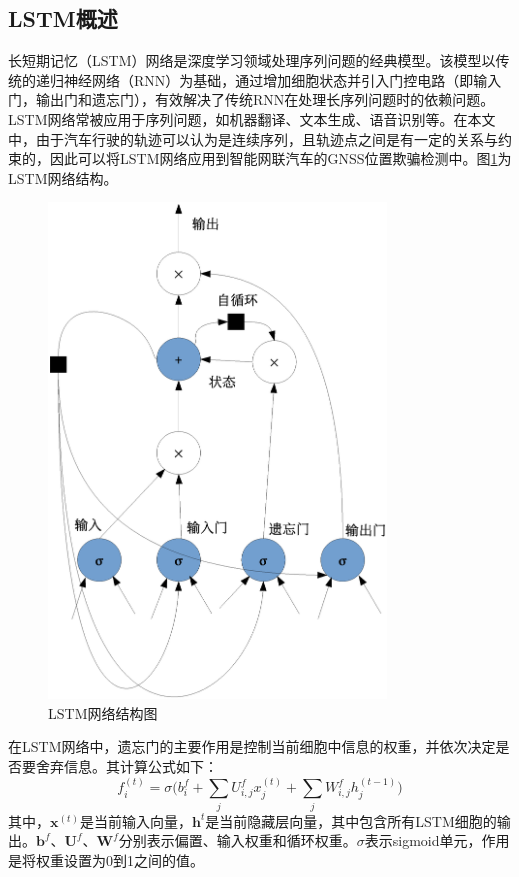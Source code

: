 \subsection{LSTM概述}
长短期记忆（LSTM）网络是深度学习领域处理序列问题的经典模型。该模型以传统的递归神经网络（RNN）为基础，通过增加细胞状态并引入门控电路（即输入门，输出门和遗忘门），有效解决了传统RNN在处理长序列问题时的依赖问题。LSTM网络常被应用于序列问题，如机器翻译、文本生成、语音识别等。在本文中，由于汽车行驶的轨迹可以认为是连续序列，且轨迹点之间是有一定的关系与约束的，因此可以将LSTM网络应用到智能网联汽车的GNSS位置欺骗检测中。图\ref{fig:LSTM_arch}为LSTM网络结构。

\begin{figure}[htbp]
    \begin{center}
        \includegraphics[width=0.8\textwidth]{../graphics/LSTM.eps}
        \caption{LSTM网络结构图}
        \label{fig:LSTM_arch}
    \end{center}
\end{figure}

在LSTM网络中，遗忘门的主要作用是控制当前细胞中信息的权重，并依次决定是否要舍弃信息。其计算公式如下：
\begin{equation}
    f_i^{(t)}=\sigma\bigg(b_i^f+\sum_jU_{i,j}^fx_j^(t)+\sum_jW_{i,j}^fh_j^{(t-1)}\bigg)
    \label{eq:3}
\end{equation}
其中，$\textbf{x}^{(t)}$是当前输入向量，$\textbf{h}^t$是当前隐藏层向量，其中包含所有LSTM细胞的输出。$\textbf{b}^f$、$\textbf{U}^f$、$\textbf{W}^f$分别表示偏置、输入权重和循环权重。$\sigma$表示sigmoid单元，作用是将权重设置为0到1之间的值。

